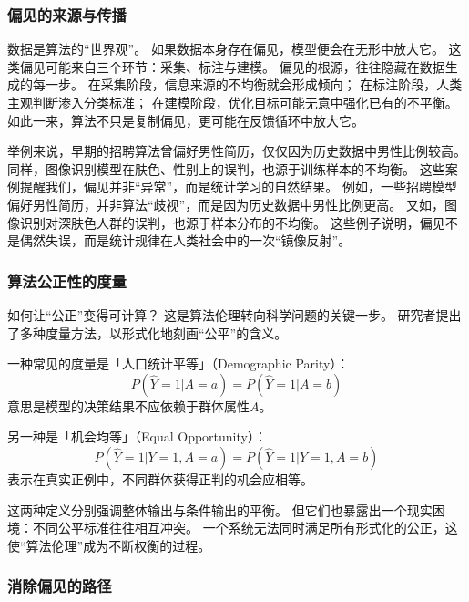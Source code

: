 \subsubsection{偏见的来源与传播}

数据是算法的“世界观”。  
如果数据本身存在偏见，模型便会在无形中放大它。  
这类偏见可能来自三个环节：采集、标注与建模。  
偏见的根源，往往隐藏在数据生成的每一步。  
在采集阶段，信息来源的不均衡就会形成倾向；  
在标注阶段，人类主观判断渗入分类标准；  
在建模阶段，优化目标可能无意中强化已有的不平衡。  
如此一来，算法不只是复制偏见，更可能在反馈循环中放大它。

举例来说，早期的招聘算法曾偏好男性简历，仅仅因为历史数据中男性比例较高。  
同样，图像识别模型在肤色、性别上的误判，也源于训练样本的不均衡。  
这些案例提醒我们，偏见并非“异常”，而是统计学习的自然结果。  
例如，一些招聘模型偏好男性简历，并非算法“歧视”，而是因为历史数据中男性比例更高。  
又如，图像识别对深肤色人群的误判，也源于样本分布的不均衡。  
这些例子说明，偏见不是偶然失误，而是统计规律在人类社会中的一次“镜像反射”。

\subsubsection{算法公正性的度量}
如何让“公正”变得可计算？  
这是算法伦理转向科学问题的关键一步。  
研究者提出了多种度量方法，以形式化地刻画“公平”的含义。  

一种常见的度量是「人口统计平等」（Demographic Parity）：  
\begin{equation}
P(\hat{Y}=1|A=a) = P(\hat{Y}=1|A=b)
\end{equation}
意思是模型的决策结果不应依赖于群体属性$A$。  

另一种是「机会均等」（Equal Opportunity）：  
\begin{equation}
P(\hat{Y}=1|Y=1, A=a) = P(\hat{Y}=1|Y=1, A=b)
\end{equation}
表示在真实正例中，不同群体获得正判的机会应相等。  

这两种定义分别强调整体输出与条件输出的平衡。  
但它们也暴露出一个现实困境：不同公平标准往往相互冲突。  
一个系统无法同时满足所有形式化的公正，这使“算法伦理”成为不断权衡的过程。

\subsubsection{消除偏见的路径}

